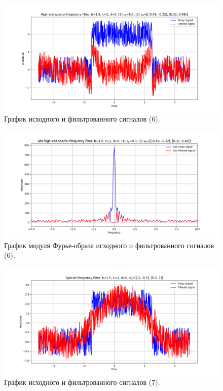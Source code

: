 \documentclass[a4paper, 12pt]{article}
\begin{document}
    \begin{figure}[H]
        \centering
        \includegraphics[scale=0.48]{6_4_u_flt_u_nospec.png}
        \captionsetup{skip=0pt}
        \caption{График исходного и фильтрованного сигналов (6).}
        \label{fig:retuer}
    \end{figure}
    \begin{figure}[!htb]
        \centering
        \includegraphics[scale=0.48]{6_4_abs_u_U_nospec.png}
        \captionsetup{skip=0pt}
        \caption{График модуля Фурье-образа исходного и фильтрованного сигналов (6).}
        \label{fig:98reu9ter}
    \end{figure}
    \begin{figure}[!htb]
        \centering
        \includegraphics[scale=0.48]{7_u_flt_u_nospec.png}
        \captionsetup{skip=0pt}
        \caption{График исходного и фильтрованного сигналов (7).}
        \label{fig:dklfksdjfo}
    \end{figure}
\end{document}
